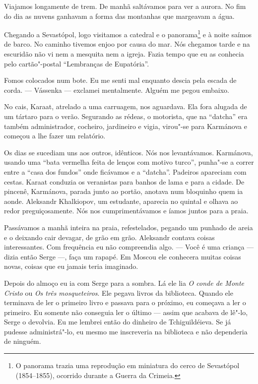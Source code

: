 Viajamos longamente de trem. De manhã saltávamos para ver a aurora. No
fim do dia as nuvens ganhavam a forma das montanhas que margeavam a
água.

Chegando a Sevastópol, logo visitamos a catedral e o panorama\footnote{O
  panorama trazia uma reprodução em miniatura do cerco de Sevastópol
  (1854--1855), ocorrido durante a Guerra da Crimeia.} e à noite saímos de
barco. No caminho tivemos enjoo por causa do mar. Nós chegamos tarde e
na escuridão não vi nem a mesquita nem a igreja. Fazia tempo que eu as
conhecia pelo cartão"-postal ``Lembranças de Eupatória''.

Fomos colocados num bote. Eu me senti mal enquanto descia pela escada de
corda. --- Vássenka --- exclamei mentalmente. Alguém me pegou embaixo.

No cais, Karaat, atrelado a uma carruagem, nos aguardava. Ela fora
alugada de um tártaro para o verão. Segurando as rédeas, o motorista,
que na ``datcha'' era também administrador, cocheiro, jardineiro e
vigia, virou"-se para Karmánova e começou a lhe fazer um relatório.

Os dias se sucediam uns aos outros, idênticos. Nós nos levantávamos.
Karmánova, usando uma ``bata vermelha feita de lenços com motivo
turco'', punha"-se a correr entre a ``casa dos fundos'' onde ficávamos e
a ``datcha''. Padeiros apareciam com cestas. Karaat conduzia os
veranistas para banhos de lama e para a cidade. De pincenê, Karmánova,
parada junto ao portão, anotava num bloquinho quem ia aonde. Aleksandr
Khalkiopov, um estudante, aparecia no quintal e olhava ao redor
preguiçosamente. Nós nos cumprimentávamos e íamos juntos para a praia.

Passávamos a manhã inteira na praia, refestelados, pegando um punhado de
areia e o deixando cair devagar, de grão em grão. Aleksandr contava
coisas interessantes. Com frequência eu não compreendia algo. --- Você é
uma criança --- dizia então Serge ---, faça um rapapé. Em Moscou ele
conhecera muitas coisas novas, coisas que eu jamais teria imaginado.

Depois do almoço eu ia com Serge para a sombra. Lá ele lia \emph{O conde
de Monte Cristo} ou \emph{Os três mosqueteiros}. Ele pegava livros da
biblioteca. Quando ele terminava de ler o primeiro livro e passava para
o próximo, eu começava a ler o primeiro. Eu somente não conseguia ler o
último --- assim que acabava de lê"-lo, Serge o devolvia. Eu me lembrei
então do dinheiro de Tchiguildéieva. Se já pudesse administrá"-lo, eu
mesmo me inscreveria na biblioteca e não dependeria de ninguém.

